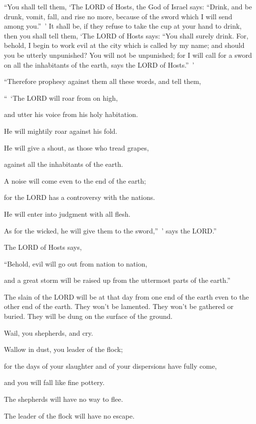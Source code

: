 \myverse{}“You shall tell them, ‘The LORD of Hosts, the God of Israel says: “Drink, and be drunk, vomit, fall, and rise no more, because of the sword which I will send among you.” ’ \myverse{}It shall be, if they refuse to take the cup at your hand to drink, then you shall tell them, ‘The LORD of Hosts says: “You shall surely drink. \myverse{}For, behold, I begin to work evil at the city which is called by my name; and should you be utterly unpunished? You will not be unpunished; for I will call for a sword on all the inhabitants of the earth, says the LORD of Hosts.” ’


\myverse{}“Therefore prophesy against them all these words, and tell them,

“ ‘The LORD will roar from on high,

and utter his voice from his holy habitation.

He will mightily roar against his fold.

He will give a shout, as those who tread grapes,

against all the inhabitants of the earth.


\myverse{}A noise will come even to the end of the earth;

for the LORD has a controversy with the nations.

He will enter into judgment with all flesh.

As for the wicked, he will give them to the sword,” ’ says the LORD.”


\myverse{}The LORD of Hosts says,

“Behold, evil will go out from nation to nation,

and a great storm will be raised up from the uttermost parts of the earth.”


\myverse{}The slain of the LORD will be at that day from one end of the earth even to the other end of the earth. They won’t be lamented. They won’t be gathered or buried. They will be dung on the surface of the ground.


\myverse{}Wail, you shepherds, and cry.

Wallow in dust, you leader of the flock;

for the days of your slaughter and of your dispersions have fully come,

and you will fall like fine pottery.


\myverse{}The shepherds will have no way to flee.

The leader of the flock will have no escape.


